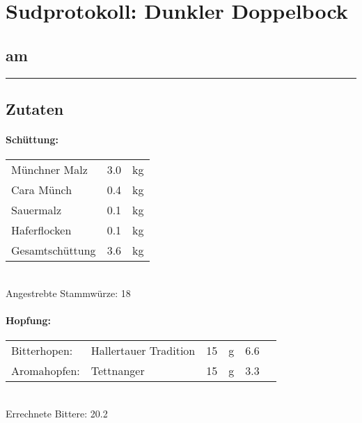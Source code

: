 \documentclass[12pt,oneside,a4paper]{scrartcl}
\begin{document}
	\begin{minipage}[c]{0.70\textwidth}
		\section*{\hspace{-.4cm}Sudprotokoll: Dunkler Doppelbock}
	\end{minipage}
	\begin{minipage}[c]{0.29\textwidth}
		\subsection*{am }
	\end{minipage}
	\rule{\textwidth}{2pt}
%
\subsection*{Zutaten}
%
\paragraph{Schüttung:}
	\begin{tabular}[t]{m{8cm} m{2cm} m{1cm}}
		Münchner Malz & \num{3,0} & \si{\kilogram} \bigstrut\\
		Cara Münch & \num{0,4} & \si{\kilogram} \bigstrut\\
		Sauermalz & \num{0,1} & \si{\kilogram} \bigstrut\\
		Haferflocken & \num{0,1} & \si{\kilogram} \bigstrut\\\hline\hline
		Gesamtschüttung & \num{3,6} & \si{\kilogram} \bigstrut
	\end{tabular}\\

\vspace{.25cm}
\hspace{1cm}Angestrebte Stammwürze: \SI{18}{\plato}
%
\paragraph{Hopfung:}
	\begin{tabular}[t]{m{2.5cm} m{5cm} m{0.5cm} m{1cm} m{0.5cm} m{1cm}}
		Bitterhopen: & Hallertauer Tradition & \num{15} & \si{\gram} & \num{6,6} & \si{\peralpha} \\
		Aromahopfen: & Tettnanger &\num{15} & \si{\gram} & \num{3,3} &  \si{\peralpha}
	\end{tabular}\\

\vspace{.25cm}
\hspace{1cm}Errechnete Bittere: \SI{20,2}{\ibu}
%
\end{document}
